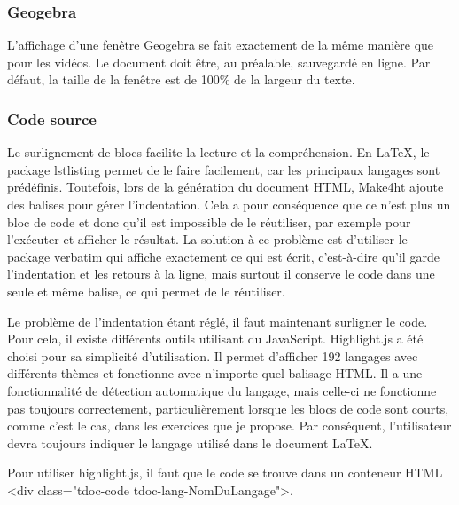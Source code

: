 \documentclass[12pt,titlepage,oneside]{article}
\renewcommand{\footnote}[1]{}
\begin{document}
\subsubsection{Geogebra}
L'affichage d'une fenêtre Geogebra\footnote{\url{https://www.geogebra.org/}} se fait exactement de la même manière que pour les vidéos. Le document doit être, au préalable, sauvegardé en ligne. Par défaut, la taille de la fenêtre est de 100\% de la largeur du texte.

\subsubsection{Code source}
Le surlignement de blocs facilite la lecture et la compréhension. En LaTeX, le package lstlisting permet de le faire facilement, car les principaux langages sont prédéfinis. Toutefois, lors de la génération du document HTML, Make4ht ajoute des balises pour gérer l'indentation. Cela a pour conséquence que ce n'est plus un bloc de code et donc qu'il est impossible de le réutiliser, par exemple pour l'exécuter et afficher le résultat. La solution à ce problème est d'utiliser le package verbatim qui affiche exactement ce qui est écrit, c'est-à-dire qu'il garde l'indentation et les retours à la ligne, mais surtout il conserve le code dans une seule et même balise, ce qui permet de le réutiliser.\par
Le problème de l'indentation étant réglé, il faut maintenant surligner le code. Pour cela, il existe différents outils utilisant du JavaScript. Highlight.js\footnote{\url{https://highlightjs.org/}} a été choisi pour sa simplicité d'utilisation. Il permet d'afficher 192 langages avec différents thèmes et fonctionne avec n'importe quel balisage HTML. Il a une fonctionnalité de détection automatique du langage, mais celle-ci ne fonctionne pas toujours correctement, particulièrement lorsque les blocs de code sont courts, comme c'est le cas, dans les exercices que je propose. Par conséquent, l'utilisateur devra toujours indiquer le langage utilisé dans le document LaTeX.\par
Pour utiliser highlight.js, il faut que le code se trouve dans un conteneur HTML <div class="tdoc-code tdoc-lang-NomDuLangage">.\par
\end{document}

